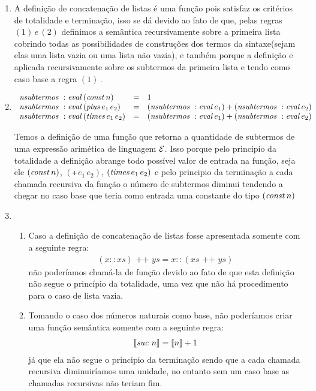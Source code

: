 \begin{enumerate}
	  \item  A defini\c{c}\~ao de concatena\c{c}\~ao de listas \'e uma fun\c{c}\~ao pois satisfaz os crit\'erios de totalidade e termina\c{c}\~ao, isso se dá devido ao fato de que, pelas regras $(1) \, e \, (2)$ definimos a sem\^antica recursivamente sobre a primeira lista cobrindo todas as possibilidades de constru\c{c}\~oes dos termos da sintaxe(sejam elas uma lista vazia ou uma lista n\~ao vazia), e tamb\'em porque a defini\c{c}\~ao e aplicada recursivamente sobre os subtermos da primeira lista e tendo como caso base a regra $(1)$\,.
	  
	  \item 
	  \[
	  \begin{array}{lcl}
	  \textit{nsubtermos }:\textit{eval\/}\, (\textit{const\/}\, n)  & = & 1 \\
	  \textit{nsubtermos }:\textit{eval\/}\, (\textit{plus\/}\,e_1\,e_2) & = & (\textit{nsubtermos }: \textit{eval\/}\,e_1) + (\textit{nsubtermos }: \textit{eval\/}\,e_2) \\
	  \textit{nsubtermos }:\textit{eval\/}\, (\textit{times\/}\,e_1\,e_2) & = & (\textit{nsubtermos }: \textit{eval\/}\,e_1) + (\textit{nsubtermos }: \textit{eval\/}\,e_2) \\
	  \end{array}
	  \]
	  
	  Temos a definição de uma função que retorna a quantidade de subtermos de uma expressão arimética de linguagem $\mathcal{E}$. Isso porque pelo princípio da totalidade a definição abrange todo possível valor de entrada na função, seja ele $(\textit{const\/}\, n)$, $(\tplus\,e_1\,e_2)$, $(\textit{times\/}\,e_1\,e_2)$ e pelo principio da terminação a cada chamada recursiva da função o número de subtermos diminui tendendo a chegar no caso base que teria como entrada uma constante do tipo $(\textit{const\/}\, n)$
	  
	  
	  \item  
	  \begin{enumerate}
	  \item Caso a definição de concatenação de listas fosse apresentada somente com a seguinte regra: 
	  	  \[
	  	  \begin{array}{c}
	  	  	(x :: xs) \text{ ++ }  ys  =  x :: (xs\text{ ++ } ys)
	  	  \end{array}
	  	  \] 
	  não poderíamos chamá-la de função devido ao fato de que esta definição não segue o princípio da totalidade, uma vez que não há procedimento para o caso de lista vazia. 
	 
	 \item Tomando o caso dos números naturais como base, não poderíamos criar uma função semântica somente com a seguinte regra:
	 	 \[
	 	 \begin{array}{c}
	 	 	\llbracket \textit{suc\/}\,\,n\rrbracket  =  \llbracket n \rrbracket + 1
	 	\end{array}
	 	\] 
	 já que ela não segue o principio da terminação sendo que a cada chamada recursiva diminuiríamos uma unidade, no entanto sem um caso base as chamadas recursivas não teriam fim.
	 \end{enumerate}
	 
	\end{enumerate}


